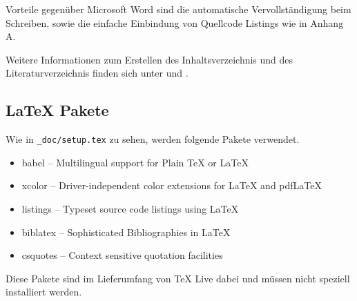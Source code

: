 Vorteile gegenüber Microsoft Word sind die automatische Vervollständigung beim Schreiben, sowie die einfache Einbindung von Quellcode Listings wie in Anhang A.

Weitere Informationen zum Erstellen des Inhaltsverzeichnis und des Literaturverzeichnis finden sich unter \cite{inhaltsverzeichnis} und \cite{literaturverzeichnis}.

\subsection{LaTeX Pakete}
Wie in \verb|_doc/setup.tex| zu sehen, werden folgende Pakete verwendet.
\begin{itemize}
    \item babel -- Multilingual support for Plain TeX or LaTeX
    \item xcolor -- Driver-independent color extensions for LaTeX and pdfLaTeX
    \item listings -- Typeset source code listings using LaTeX
    \item biblatex -- Sophisticated Bibliographies in LaTeX
    \item csquotes -- Context sensitive quotation facilities
\end{itemize}
Diese Pakete sind im Lieferumfang von TeX Live dabei und müssen nicht speziell installiert werden.
